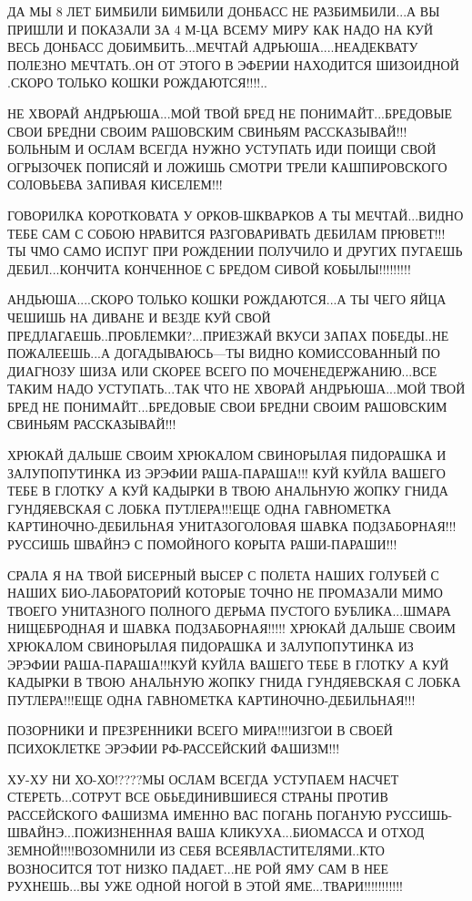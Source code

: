 ДА МЫ 8 ЛЕТ БИМБИЛИ БИМБИЛИ ДОНБАСС НЕ РАЗБИМБИЛИ...А ВЫ ПРИШЛИ И ПОКАЗАЛИ ЗА 4
М-ЦА ВСЕМУ МИРУ КАК НАДО НА КУЙ ВЕСЬ ДОНБАСС ДОБИМБИТЬ...МЕЧТАЙ
АДРЬЮША....НЕАДЕКВАТУ ПОЛЕЗНО МЕЧТАТЬ..ОН ОТ ЭТОГО В ЭФЕРИИ НАХОДИТСЯ ШИЗОИДНОЙ
.СКОРО ТОЛЬКО КОШКИ РОЖДАЮТСЯ!!!!..

НЕ ХВОРАЙ АНДРЬЮША...МОЙ ТВОЙ БРЕД НЕ ПОНИМАЙТ...БРЕДОВЫЕ СВОИ БРЕДНИ СВОИМ
РАШОВСКИМ СВИНЬЯМ РАССКАЗЫВАЙ!!!БОЛЬНЫМ И ОСЛАМ ВСЕГДА НУЖНО УСТУПАТЬ ИДИ ПОИЩИ
СВОЙ ОГРЫЗОЧЕК ПОПИСЯЙ И ЛОЖИШЬ СМОТРИ ТРЕЛИ КАШПИРОВСКОГО СОЛОВЬЕВА ЗАПИВАЯ
КИСЕЛЕМ!!!        

ГОВОРИЛКА КОРОТКОВАТА У ОРКОВ-ШКВАРКОВ  А ТЫ МЕЧТАЙ...ВИДНО ТЕБЕ САМ С СОБОЮ
НРАВИТСЯ РАЗГОВАРИВАТЬ ДЕБИЛАМ   ПРЮВЕТ!!! ТЫ ЧМО САМО ИСПУГ ПРИ РОЖДЕНИИ
ПОЛУЧИЛО И ДРУГИХ ПУГАЕШЬ ДЕБИЛ...КОНЧИТА КОНЧЕННОЕ С БРЕДОМ СИВОЙ
КОБЫЛЫ!!!!!!!!!                                     

АНДЬЮША....СКОРО ТОЛЬКО КОШКИ РОЖДАЮТСЯ...А ТЫ ЧЕГО ЯЙЦА ЧЕШИШЬ НА ДИВАНЕ И
ВЕЗДЕ КУЙ СВОЙ ПРЕДЛАГАЕШЬ..ПРОБЛЕМКИ?...ПРИЕЗЖАЙ ВКУСИ ЗАПАХ ПОБЕДЫ..НЕ
ПОЖАЛЕЕШЬ...А ДОГАДЫВАЮСЬ---ТЫ ВИДНО КОМИССОВАННЫЙ ПО ДИАГНОЗУ ШИЗА ИЛИ СКОРЕЕ
ВСЕГО ПО МОЧЕНЕДЕРЖАНИЮ...ВСЕ ТАКИМ НАДО УСТУПАТЬ...ТАК ЧТО НЕ ХВОРАЙ
АНДРЬЮША...МОЙ ТВОЙ БРЕД НЕ ПОНИМАЙТ...БРЕДОВЫЕ СВОИ БРЕДНИ СВОИМ РАШОВСКИМ
СВИНЬЯМ РАССКАЗЫВАЙ!!!            

ХРЮКАЙ ДАЛЬШЕ СВОИМ ХРЮКАЛОМ СВИНОРЫЛАЯ ПИДОРАШКА И ЗАЛУПОПУТИНКА ИЗ ЭРЭФИИ
РАША-ПАРАША!!!  КУЙ КУЙЛА ВАШЕГО ТЕБЕ В ГЛОТКУ А КУЙ КАДЫРКИ В ТВОЮ АНАЛЬНУЮ
ЖОПКУ ГНИДА ГУНДЯЕВСКАЯ С ЛОБКА ПУТЛЕРА!!!ЕЩЕ ОДНА ГАВНОМЕТКА
КАРТИНОЧНО-ДЕБИЛЬНАЯ УНИТАЗОГОЛОВАЯ ШАВКА ПОДЗАБОРНАЯ!!! РУССИШЬ ШВАЙНЭ С
ПОМОЙНОГО КОРЫТА РАШИ-ПАРАШИ!!!        

СРАЛА Я НА ТВОЙ БИСЕРНЫЙ ВЫСЕР С ПОЛЕТА НАШИХ ГОЛУБЕЙ С НАШИХ БИО-ЛАБОРАТОРИЙ
КОТОРЫЕ ТОЧНО НЕ ПРОМАЗАЛИ МИМО ТВОЕГО УНИТАЗНОГО ПОЛНОГО ДЕРЬМА ПУСТОГО
БУБЛИКА...ШМАРА НИЩЕБРОДНАЯ И ШАВКА ПОДЗАБОРНАЯ!!!!! ХРЮКАЙ ДАЛЬШЕ СВОИМ
ХРЮКАЛОМ СВИНОРЫЛАЯ ПИДОРАШКА И ЗАЛУПОПУТИНКА ИЗ ЭРЭФИИ РАША-ПАРАША!!!КУЙ КУЙЛА
ВАШЕГО ТЕБЕ В ГЛОТКУ А КУЙ КАДЫРКИ В ТВОЮ АНАЛЬНУЮ ЖОПКУ ГНИДА ГУНДЯЕВСКАЯ С
ЛОБКА ПУТЛЕРА!!!ЕЩЕ ОДНА ГАВНОМЕТКА КАРТИНОЧНО-ДЕБИЛЬНАЯ!!!                                                  

ПОЗОРНИКИ И ПРЕЗРЕННИКИ ВСЕГО МИРА!!!!ИЗГОИ В СВОЕЙ ПСИХОКЛЕТКЕ ЭРЭФИИ
РФ-РАССЕЙСКИЙ ФАШИЗМ!!!

ХУ-ХУ НИ ХО-ХО!????МЫ ОСЛАМ ВСЕГДА УСТУПАЕМ НАСЧЕТ СТЕРЕТЬ...СОТРУТ ВСЕ
ОБЬЕДИНИВШИЕСЯ СТРАНЫ ПРОТИВ РАССЕЙСКОГО ФАШИЗМА ИМЕННО ВАС ПОГАНЬ ПОГАНУЮ
РУССИШЬ-ШВАЙНЭ...ПОЖИЗНЕННАЯ ВАША КЛИКУХА...БИОМАССА И ОТХОД
ЗЕМНОЙ!!!!ВОЗОМНИЛИ ИЗ СЕБЯ ВСЕЯВЛАСТИТЕЛЯМИ..КТО ВОЗНОСИТСЯ ТОТ НИЗКО
ПАДАЕТ...НЕ РОЙ ЯМУ САМ В НЕЕ РУХНЕШЬ...ВЫ УЖЕ ОДНОЙ НОГОЙ В ЭТОЙ
ЯМЕ...ТВАРИ!!!!!!!!!!!                       

